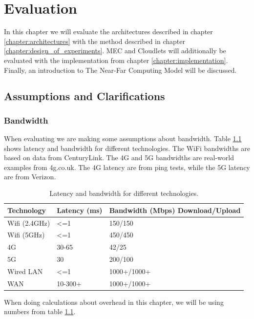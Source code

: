 \chapter{Evaluation}\label{chapter:evaluation}

In this chapter we will evaluate the architectures described in chapter \ref{chapter:architectures} with the method described in chapter \ref{chapter:design_of_experiments}. MEC and Cloudlets will additionally be evaluated with the implementation from chapter \ref{chapter:implementation}. Finally, an introduction to The Near-Far Computing Model will be discussed.






\section{Assumptions and Clarifications}
\subsection{Bandwidth}
When evaluating we are making some assumptions about bandwidth. Table \ref{tab:Bandwidth_latency} shows latency and bandwidth for different technologies. The WiFi bandwidths are based on data from CenturyLink\cite{noauthor_24_nodate}. The 4G and 5G bandwidths are real-world examples from 4g.co.uk\cite{noauthor_how_nodate}. The 4G latency are from ping tests, while the 5G latency are from Verizon\cite{noauthor_what_2020}.
\renewcommand{\arraystretch}{1.2}
\begin{table}[h!]
    \centering
    \begin{tabular}[c]{l|p{3cm}p{4cm}}

        Technology & Latency (ms) & Bandwidth (Mbps) Download/Upload \\
        \hline

        Wifi (2.4GHz) & <=1 & 150/150  \\

        Wifi (5GHz) & <=1 & 450/450  \\

        4G & 30-65 & 42/25  \\

        5G & 30 & 200/100  \\

        Wired LAN & <=1 & 1000+/1000+  \\

        WAN & 10-300+ & 1000+/1000+  \\

        
        
    \end{tabular}
    \caption{Latency and bandwidth for different technologies.}
    \label{tab:Bandwidth_latency}
\end{table}
When doing calculations about overhead in this chapter, we will be using numbers from table \ref{tab:Bandwidth_latency}.





